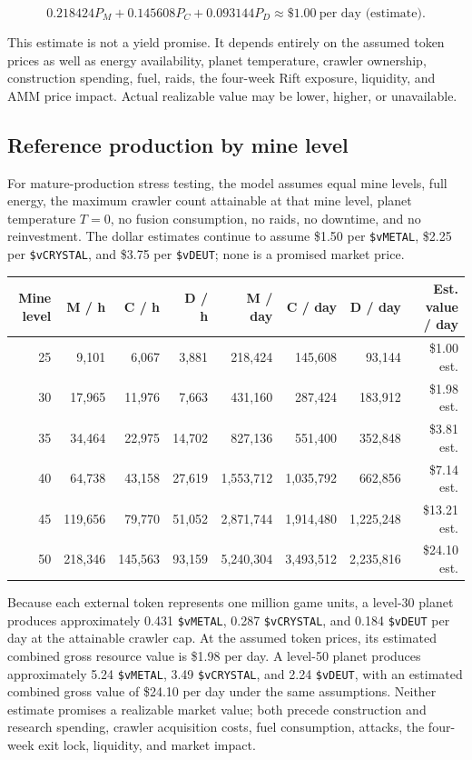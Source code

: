 \documentclass[11pt]{article}
\newcommand{\token}[1]{\texttt{\$#1}}
\begin{document}
\[
0.218424P_M+0.145608P_C+0.093144P_D\approx\$1.00\ \text{per day (estimate)}.
\]

This estimate is not a yield promise. It depends entirely on the assumed token prices as well as energy availability, planet temperature, crawler ownership, construction spending, fuel, raids, the four-week Rift exposure, liquidity, and AMM price impact. Actual realizable value may be lower, higher, or unavailable.

\subsection{Reference production by mine level}

For mature-production stress testing, the model assumes equal mine levels, full energy, the maximum crawler count attainable at that mine level, planet temperature $T=0$, no fusion consumption, no raids, no downtime, and no reinvestment. The dollar estimates continue to assume \$1.50 per \token{vMETAL}, \$2.25 per \token{vCRYSTAL}, and \$3.75 per \token{vDEUT}; none is a promised market price.

\begin{table}[H]
\centering
\scriptsize
\begin{tabular}{@{}r r r r r r r r@{}}
\toprule
\textbf{Mine level} & \textbf{M / h} & \textbf{C / h} & \textbf{D / h} & \textbf{M / day} & \textbf{C / day} & \textbf{D / day} & \textbf{Est. value / day} \\
\midrule
25 & 9,101 & 6,067 & 3,881 & 218,424 & 145,608 & 93,144 & \$1.00 est. \\
30 & 17,965 & 11,976 & 7,663 & 431,160 & 287,424 & 183,912 & \$1.98 est. \\
35 & 34,464 & 22,975 & 14,702 & 827,136 & 551,400 & 352,848 & \$3.81 est. \\
40 & 64,738 & 43,158 & 27,619 & 1,553,712 & 1,035,792 & 662,856 & \$7.14 est. \\
45 & 119,656 & 79,770 & 51,052 & 2,871,744 & 1,914,480 & 1,225,248 & \$13.21 est. \\
50 & 218,346 & 145,563 & 93,159 & 5,240,304 & 3,493,512 & 2,235,816 & \$24.10 est. \\
\bottomrule
\end{tabular}
\end{table}

Because each external token represents one million game units, a level-30 planet produces approximately 0.431 \token{vMETAL}, 0.287 \token{vCRYSTAL}, and 0.184 \token{vDEUT} per day at the attainable crawler cap. At the assumed token prices, its estimated combined gross resource value is \$1.98 per day. A level-50 planet produces approximately 5.24 \token{vMETAL}, 3.49 \token{vCRYSTAL}, and 2.24 \token{vDEUT}, with an estimated combined gross value of \$24.10 per day under the same assumptions. Neither estimate promises a realizable market value; both precede construction and research spending, crawler acquisition costs, fuel consumption, attacks, the four-week exit lock, liquidity, and market impact.
\end{document}
